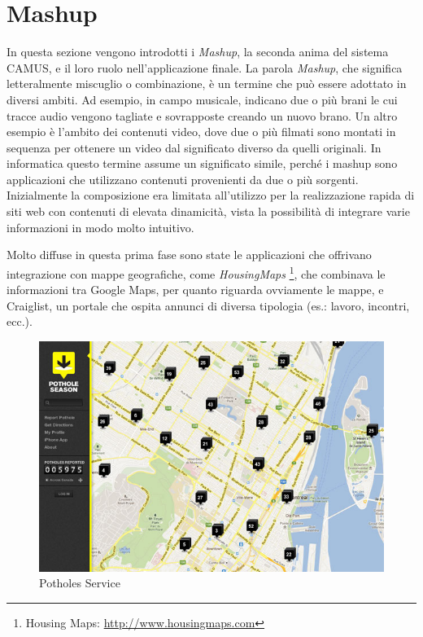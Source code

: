 \section{Mashup\label{sec:mashup}}

In questa sezione vengono introdotti i \emph{Mashup}, la seconda anima del sistema CAMUS, e il loro ruolo nell'applicazione finale.
La parola \emph{Mashup}, che significa letteralmente miscuglio o combinazione, è un termine che può essere adottato in diversi ambiti.
Ad esempio, in campo musicale, indicano due o più brani le cui tracce audio vengono tagliate e sovrapposte creando un nuovo brano. Un altro esempio è l'ambito dei contenuti video, dove due o più filmati sono montati in sequenza per ottenere un video dal significato diverso da quelli originali.
In informatica questo termine assume un significato simile, perché i mashup sono applicazioni che utilizzano contenuti provenienti da due o più sorgenti\cite{DBLP:books/sp/DanielM14}.
Inizialmente la composizione era limitata all'utilizzo per la realizzazione rapida di siti web con contenuti di elevata dinamicità, vista la possibilità di integrare varie informazioni in modo molto intuitivo.

Molto diffuse in questa prima fase sono state le applicazioni che offrivano integrazione con mappe geografiche, come \emph{HousingMaps} \footnote{Housing Maps: \url{http://www.housingmaps.com}}, che combinava le informazioni tra Google Maps, per quanto riguarda ovviamente le mappe, e Craiglist, un portale che ospita annunci di diversa tipologia (es.: lavoro, incontri, ecc.).
\begin{figure}[ht]
	\centering
	\includegraphics[width=\textwidth]{2-nozioni-preliminari/Immagini/potholes_service.jpg}
	\caption{Potholes Service}\label{fig:potholes}
\end{figure}

